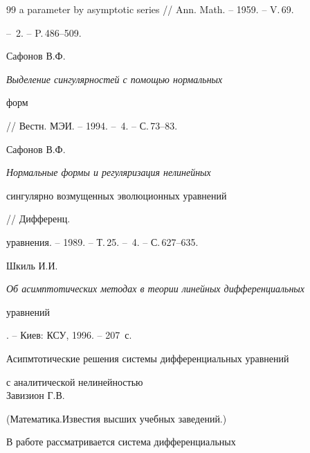\begin{thebibliography}{99}
{a parameter by asymptotic series} // Ann. Math. -- 1959. -- V.\,69.


-- \No\,2. -- P.\,486--509.




Сафонов В.Ф. {\em Выделение сингулярностей с помощью нормальных


форм} // Вестн. МЭИ. -- 1994. -- \No\,4. -- С.\,73--83.




Сафонов В.Ф. {\em Нормальные формы и регуляризация нелинейных


сингулярно возмущенных эволюционных уравнений} // Дифференц.


уравнения. -- 1989. -- Т.\,25. -- \No\,4. -- С.\,627--635.




Шкиль И.И. {\em Об асимптотических методах в теории линейных дифференциальных


уравнений}. -- Киев: КСУ, 1996. -- 207~с.








\end{thebibliography} 


 


\vskip 2cm 


 






 


\label{end} 


 

















\newpage


 Асипмтотические решения системы дифференциальных уравнений


с аналитической нелинейностью \\ Завизион Г.В.


(Математика.Известия высших учебных заведений.)


 В работе рассматривается система дифференциальных


